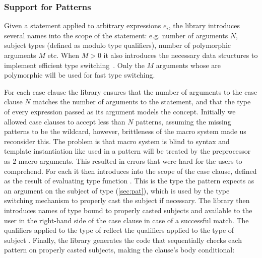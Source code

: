 
\subsubsection{Support for Patterns}
\label{sec:patcases}

Given a statement  applied to arbitrary expressions $e_i$, the library introduces several 
names into the scope of the statement: e.g. number of arguments $N$, subject 
types  (defined as  modulo type 
qualifiers), number of polymorphic arguments $M$ etc. When $M > 0$ it also 
introduces the necessary data structures to implement efficient type 
switching~\cite{TS12}. Only the $M$ arguments whose  are 
polymorphic will be used for fast type switching.

For each case clause  the library ensures that the 
number of arguments to the case clause $N$ matches the number of arguments to 
the  statement, and that the type  of every expression 
 passed as its argument models the  concept. 
Initially we allowed case clauses to accept less than $N$ patterns, assuming the 
missing patterns to be the wildcard, however, brittleness of the macro system 
made us reconsider this. The problem is that macro system is blind to \Cpp{} 
syntax and template instantiation like  used in a pattern will be 
treated by the preprocessor as 2 macro arguments. This resulted in errors that 
were hard for the users to comprehend.
For each  it then introduces  into the 
scope of the case clause, defined as the result of evaluating type function 
. This is the type the pattern 
expects as an argument on the subject of type  (\textsection\ref{sec:pat}), 
which is used by the type switching mechanism to properly cast the subject if necessary. 
The library then introduces names  of type  
bound to properly casted subjects and available to the user in the right-hand 
side of the case clause in case of a successful match. The qualifiers applied to 
the type of  reflect the qualifiers applied to the type of subject 
. Finally, the library generates the code that sequentially checks 
each pattern on properly casted subjects, making the clause's body conditional:

